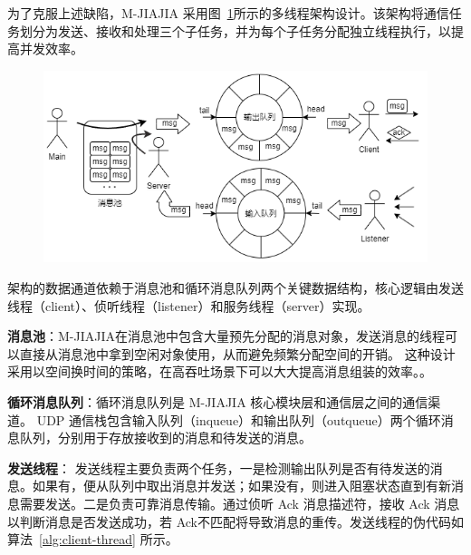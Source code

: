 {\begin{enumerate}[label=\arabic*.]
              为了克服上述缺陷，M-JIAJIA 采用图~\ref{fig:mjiajia-multithread}所示的多线程架构设计。该架构将通信任务划分为发送、接收和处理三个子任务，并为每个子任务分配独立线程执行，以提高并发效率。
              \begin{figure}[H]
                  \centering
                  \includegraphics[width=1.0\textwidth]{Img/Multithread-arch.png}
                  \label{fig:mjiajia-multithread}
              \end{figure}

              架构的数据通道依赖于消息池和循环消息队列两个关键数据结构，核心逻辑由发送线程（client）、侦听线程（listener）和服务线程（server）实现。

              \textbf{消息池}：M-JIAJIA在消息池中包含大量预先分配的消息对象，发送消息的线程可以直接从消息池中拿到空闲对象使用，从而避免频繁分配空间的开销。
              这种设计采用以空间换时间的策略，在高吞吐场景下可以大大提高消息组装的效率。。

              \textbf{循环消息队列}：循环消息队列是 M-JIAJIA 核心模块层和通信层之间的通信渠道。
              UDP 通信栈包含输入队列（inqueue）和输出队列（outqueue）两个循环消息队列，分别用于存放接收到的消息和待发送的消息。

              \textbf{发送线程}： 发送线程主要负责两个任务，一是检测输出队列是否有待发送的消息。如果有，便从队列中取出消息并发送；如果没有，则进入阻塞状态直到有新消息需要发送。二是负责可靠消息传输。通过侦听 Ack 消息描述符，接收 Ack 消息以判断消息是否发送成功，若 Ack不匹配将导致消息的重传。发送线程的伪代码如算法~\ref{alg:client-thread} 所示。


\end{enumerate}}
